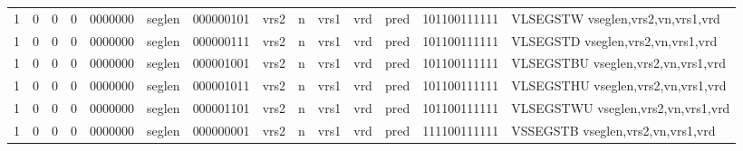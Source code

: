 \begin{landscape}
\begin{table}[p]
\begin{small}
\begin{center}
\begin{tabular}{p{0.08in}@{}p{0.08in}@{}p{0.08in}@{}p{0.08in}@{}p{0.50in}@{}p{0.30in}@{}p{0.08in}@{}p{0.8in}@{}p{0.48in}@{}p{0.32in}@{}p{0.08in}@{}p{0.8in}@{}p{0.8in}@{}p{0.4in}@{}p{0.56in}l}
\multicolumn{1}{|c|}{1} &
\multicolumn{1}{c|}{0} &
\multicolumn{1}{c|}{0} &
\multicolumn{1}{c|}{0} &
\multicolumn{1}{c|}{0000000} &
\multicolumn{1}{c|}{seglen} &
\multicolumn{2}{c|}{000000101} &
\multicolumn{2}{c|}{vrs2} &
\multicolumn{1}{c|}{n} &
\multicolumn{1}{c|}{vrs1} &
\multicolumn{1}{c|}{vrd} &
\multicolumn{1}{c|}{pred} &
\multicolumn{1}{c|}{101100111111} & VLSEGSTW vseglen,vrs2,vn,vrs1,vrd \\
\cline{1-15}
  

\multicolumn{1}{|c|}{1} &
\multicolumn{1}{c|}{0} &
\multicolumn{1}{c|}{0} &
\multicolumn{1}{c|}{0} &
\multicolumn{1}{c|}{0000000} &
\multicolumn{1}{c|}{seglen} &
\multicolumn{2}{c|}{000000111} &
\multicolumn{2}{c|}{vrs2} &
\multicolumn{1}{c|}{n} &
\multicolumn{1}{c|}{vrs1} &
\multicolumn{1}{c|}{vrd} &
\multicolumn{1}{c|}{pred} &
\multicolumn{1}{c|}{101100111111} & VLSEGSTD vseglen,vrs2,vn,vrs1,vrd \\
\cline{1-15}
  

\multicolumn{1}{|c|}{1} &
\multicolumn{1}{c|}{0} &
\multicolumn{1}{c|}{0} &
\multicolumn{1}{c|}{0} &
\multicolumn{1}{c|}{0000000} &
\multicolumn{1}{c|}{seglen} &
\multicolumn{2}{c|}{000001001} &
\multicolumn{2}{c|}{vrs2} &
\multicolumn{1}{c|}{n} &
\multicolumn{1}{c|}{vrs1} &
\multicolumn{1}{c|}{vrd} &
\multicolumn{1}{c|}{pred} &
\multicolumn{1}{c|}{101100111111} & VLSEGSTBU vseglen,vrs2,vn,vrs1,vrd \\
\cline{1-15}
  

\multicolumn{1}{|c|}{1} &
\multicolumn{1}{c|}{0} &
\multicolumn{1}{c|}{0} &
\multicolumn{1}{c|}{0} &
\multicolumn{1}{c|}{0000000} &
\multicolumn{1}{c|}{seglen} &
\multicolumn{2}{c|}{000001011} &
\multicolumn{2}{c|}{vrs2} &
\multicolumn{1}{c|}{n} &
\multicolumn{1}{c|}{vrs1} &
\multicolumn{1}{c|}{vrd} &
\multicolumn{1}{c|}{pred} &
\multicolumn{1}{c|}{101100111111} & VLSEGSTHU vseglen,vrs2,vn,vrs1,vrd \\
\cline{1-15}
  

\multicolumn{1}{|c|}{1} &
\multicolumn{1}{c|}{0} &
\multicolumn{1}{c|}{0} &
\multicolumn{1}{c|}{0} &
\multicolumn{1}{c|}{0000000} &
\multicolumn{1}{c|}{seglen} &
\multicolumn{2}{c|}{000001101} &
\multicolumn{2}{c|}{vrs2} &
\multicolumn{1}{c|}{n} &
\multicolumn{1}{c|}{vrs1} &
\multicolumn{1}{c|}{vrd} &
\multicolumn{1}{c|}{pred} &
\multicolumn{1}{c|}{101100111111} & VLSEGSTWU vseglen,vrs2,vn,vrs1,vrd \\
\cline{1-15}
  

\multicolumn{1}{|c|}{1} &
\multicolumn{1}{c|}{0} &
\multicolumn{1}{c|}{0} &
\multicolumn{1}{c|}{0} &
\multicolumn{1}{c|}{0000000} &
\multicolumn{1}{c|}{seglen} &
\multicolumn{2}{c|}{000000001} &
\multicolumn{2}{c|}{vrs2} &
\multicolumn{1}{c|}{n} &
\multicolumn{1}{c|}{vrs1} &
\multicolumn{1}{c|}{vrd} &
\multicolumn{1}{c|}{pred} &
\multicolumn{1}{c|}{111100111111} & VSSEGSTB vseglen,vrs2,vn,vrs1,vrd \\
\cline{1-15}
  


\end{tabular}
\end{center}
\end{small}
\end{table}
\end{landscape}
